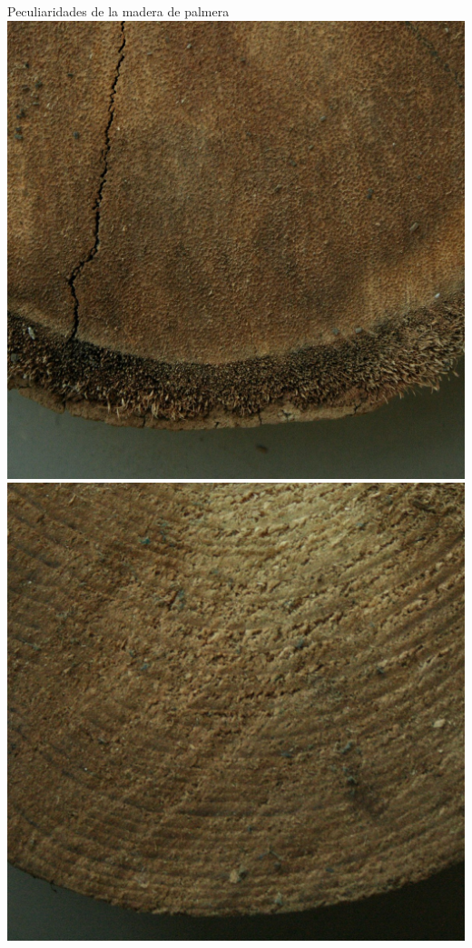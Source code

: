 \documentclass[utf8, compress]			{beamer}
\begin{document}
\begin{frame}{Peculiaridades de la madera de palmera}
    \includegraphics{spalmera.jpg}
    \hspace{1em}
    \includegraphics{spino.jpg}
\end{frame}
\end{document}
